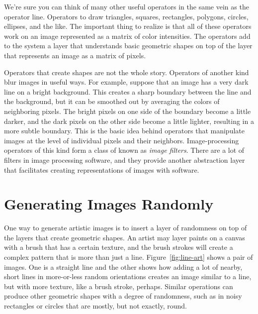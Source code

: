 We're sure you can think of many other useful operators in
the same vein as the operator \textsf{line}. Operators to draw
triangles, squares, rectangles, polygons, circles,
ellipses, and the like. The important thing to realize is that all of
these operators work on an image represented as a matrix of
color intensities.
The operators add to the system a layer that understands
basic geometric shapes on top of the layer that represents an image
as a matrix of pixels.

Operators that create shapes are not the whole story.
Operators of another kind blur images in useful ways.
For example, suppose that an image has a
very dark line on a bright background. This creates a
sharp boundary between the line and the background, but it can be
smoothed out by averaging the colors of neighboring pixels.
The bright pixels on one side of the boundary become a little darker,
and the dark pixels on the other side become a little lighter,
resulting in a more subtle boundary. This is the basic idea behind
operators that manipulate images at the level
of individual pixels and their neighbors. Image-processing operators
of this kind form a class of  known as \emph{image filters}.
There are a lot of filters in image
processing software, and they provide another abstraction layer
that facilitates creating representations of images with software.

\section{Generating Images Randomly}

One way to generate artistic images is to insert a layer of
randomness on top of the layers that create geometric shapes.
An artist may layer paints on a canvas
with a brush that has a certain texture, and the brush strokes
will create a complex pattern that is more than just a line.
Figure~\ref{fig:line-art} shows a pair of images.
One is a straight line
and the other shows how adding a lot of nearby, short lines in
more-or-less random orientations
creates an image similar to a line, but with more texture,
like a brush stroke, perhaps.
Similar operations can produce
other geometric shapes with a degree of randomness,
such as in noisy rectangles or circles that are
mostly, but not exactly, round.

